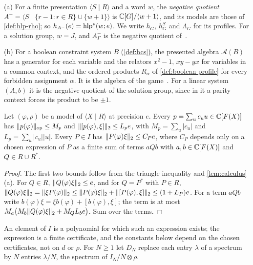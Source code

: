 \begin{example}\label{ex:presented}
(a) For a finite presentation $\langle S\mid R\rangle$ and a word $w$, the \emph{negative quotient}
$A^-=\langle S\mid\{r-1:r\in R\}\cup\{w+1\}\rangle$ is $\mathbb C[G]/\langle w+1\rangle$, and its models are those of
\cref{def:hlp-rho}; so $h_{A^-}(e)=\operatorname{hlp}^\rho(w;e)$. We write $h_G$, $h_G^S$ and $\Lambda_G$ for its profiles. For a solution
group, $w=J$, and $A^-_\Gamma$ is the negative quotient of~\cite{CM14,PS23}.

(b) For a boolean constraint system $B$ (\cref{def:bcs}), the presented algebra $\mathcal A(B)$ has a generator for each
variable and the relators $x^2-1$, $xy-yx$ for variables in a common context, and the ordered products $R_\alpha$ of
\cref{def:boolean-profile} for every forbidden assignment $\alpha$. It is the algebra of the game~\cite{PS23}. For a linear
system $(A,b)$ it is the negative quotient of the solution group, since in it a parity context forces its product to be
$\pm1$.
\end{example}

\begin{lemma}\label{lem:finite-identity}
Let $(\varphi,\rho)$ be a model of $\langle X\mid R\rangle$ at precision $e$. Every $p=\sum_uc_uu\in\mathbb C[F(X)]$ has
$\lVert p(\varphi)\rVert_{\mathrm{op}}\le M_p$ and $\lVert [p(\varphi),\xi]\rVert_2\le L_pe$, with $M_p=\sum_u|c_u|$ and $L_p=\sum_u|c_u||u|$. Every $P\in I$
has $\lVert P(\varphi)\xi\rVert_2\le C_Pe$, where $C_P$ depends only on a chosen expression of $P$ as a finite sum of terms $aQb$ with
$a,b\in\mathbb C[F(X)]$ and $Q\in R\cup R^*$.
\end{lemma}

\begin{proof}
The first two bounds follow from the triangle inequality and \cref{lem:calculus}(a). For $Q\in R$,
$\lVert Q(\varphi)\xi\rVert_2\le e$, and for $Q=P^*$ with $P\in R$, $\lVert Q(\varphi)\xi\rVert_2=\lVert \xi P(\varphi)\rVert_2\le\lVert P(\varphi)\xi\rVert_2+
\lVert [P(\varphi),\xi]\rVert_2\le(1+L_P)e$. For a term $aQb$ write $b(\varphi)\xi=\xi b(\varphi)+[b(\varphi),\xi]$; the term is at most
$M_a\bigl(M_b\lVert Q(\varphi)\xi\rVert_2+M_QL_be\bigr)$. Sum over the terms.
\end{proof}

An element of $I$ is a polynomial for which such an expression exists; the expression is a finite certificate, and the
constants below depend on the chosen certificates, not on $d$ or $\rho$. For $N\ge1$ let $D_N$ replace each entry
$\lambda$ of a spectrum by $N$ entries $\lambda/N$, the spectrum of $I_N/N\otimes\rho$.

